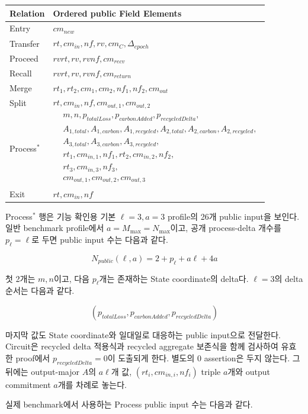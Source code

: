 \documentclass[11pt,a4paper]{extarticle}
\begin{document}
\begin{longtable}{@{}p{}p{}@{}}
\toprule
Relation & Ordered public Field Elements \\
\midrule
\endhead
Entry & $cm_{new}$ \\
Transfer & $rt,cm_{in},nf,rv,cm_C,\Delta_{epoch}$ \\
Proceed & $rvrt,rv,rvnf,cm_{recv}$ \\
Recall & $rvrt,rv,rvnf,cm_{return}$ \\
Merge & $rt_1,rt_2,cm_1,cm_2,nf_1,nf_2,cm_{out}$ \\
Split & $rt,cm_{in},nf,cm_{out,1},cm_{out,2}$ \\
Process$^{*}$ & $\begin{aligned}
&m,n,p_{totalLoss},p_{carbonAdded},p_{recycledDelta},\\
&A_{1,total},A_{1,carbon},A_{1,recycled},
 A_{2,total},A_{2,carbon},A_{2,recycled},\\
&A_{3,total},A_{3,carbon},A_{3,recycled},\\
&rt_1,cm_{in,1},nf_1,rt_2,cm_{in,2},nf_2,\\
&rt_3,cm_{in,3},nf_3,\\
&cm_{out,1},cm_{out,2},cm_{out,3}
\end{aligned}$ \\
Exit & $rt,cm_{in},nf$ \\
\bottomrule
\end{longtable}

Process$^{*}$ 행은 기능 확인용 기본 $\ell=3,a=3$ profile의 26개 public input을 보인다.
일반 benchmark
profile에서 $a=M_{\max}=N_{\max}$이고, 공개 process-delta 개수를
$p_\ell=\ell$로 두면 public input 수는 다음과 같다.

\[
N_{public}(\ell,a)=2+p_\ell+a\ell+4a
\]

첫 2개는 $m,n$이고, 다음 $p_\ell$개는 존재하는 State coordinate의 delta다.
$\ell=3$의 delta 순서는 다음과 같다.

\[
(p_{totalLoss},p_{carbonAdded},p_{recycledDelta})
\]

마지막 값도 State coordinate와 일대일로 대응하는 public input으로 전달한다. Circuit은
recycled delta 적용식과 recycled aggregate 보존식을 함께 검사하여 유효한 proof에서
$p_{recycledDelta}=0$이 도출되게 한다. 별도의 0 assertion은 두지 않는다. 그 뒤에는
output-major $A$의 $a\ell$개 값, $(rt_i,cm_{in,i},nf_i)$ triple $a$개와 output commitment
$a$개를 차례로 놓는다.

실제 benchmark에서 사용하는 Process public input 수는 다음과 같다.
\end{document}

